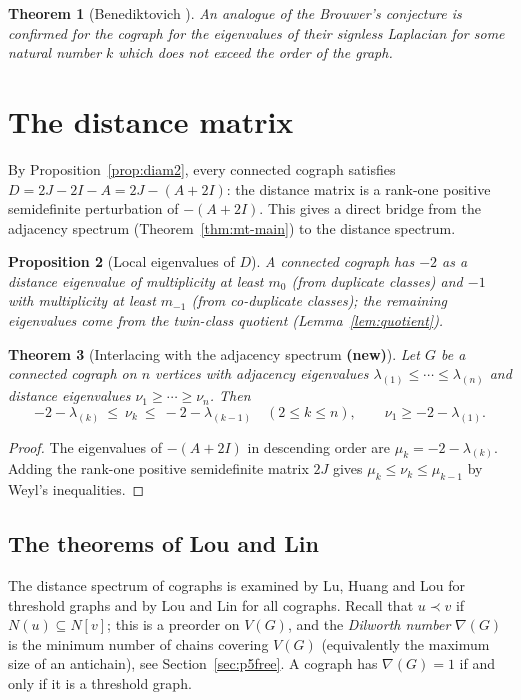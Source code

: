 \documentclass[11pt]{article}
\theoremstyle{plain}
\newtheorem{theorem}{Theorem}[section]
\newtheorem{proposition}[theorem]{Proposition}
\theoremstyle{definition}
\theoremstyle{remark}
\begin{document}
	\begin{theorem}[Benediktovich \cite{Benedik2020}]
		An analogue of the Brouwer’s conjecture is confirmed for the cograph for the eigenvalues of their signless Laplacian for some natural number $k$ which does not exceed the order of the graph.
		
	\end{theorem}
	
	\section{The distance matrix}
	\label{sec:distance}
	
	By Proposition~\ref{prop:diam2}, every connected cograph satisfies $D=2J-2I-A=2J-(A+2I)$: the distance matrix is a rank-one positive semidefinite perturbation of $-(A+2I)$. This gives a direct bridge from the adjacency spectrum (Theorem~\ref{thm:mt-main}) to the distance spectrum.
	
	\begin{proposition}[Local eigenvalues of $D$]
		\label{prop:Dlocal}
		A connected cograph has $-2$ as a distance eigenvalue of multiplicity at least $m_0$ (from duplicate classes) and $-1$ with multiplicity at least $m_{-1}$ (from co-duplicate classes); the remaining eigenvalues come from the twin-class quotient (Lemma~\ref{lem:quotient}).
	\end{proposition}
	
	\begin{theorem}[Interlacing with the adjacency spectrum \textbf{(new)}]
		\label{thm:Dinterlace}
		Let $G$ be a connected cograph on $n$ vertices with adjacency eigenvalues $\lambda_{(1)}\le\cdots\le\lambda_{(n)}$ and distance eigenvalues $\nu_1\ge\cdots\ge\nu_n$. Then
		\[
		-2-\lambda_{(k)}\ \le\ \nu_k\ \le\ -2-\lambda_{(k-1)}\quad(2\le k\le n),\qquad \nu_1\ge-2-\lambda_{(1)}.
		\]
	\end{theorem}
	\begin{proof}
		The eigenvalues of $-(A+2I)$ in descending order are $\mu_k=-2-\lambda_{(k)}$. Adding the rank-one positive semidefinite matrix $2J$ gives $\mu_k\le\nu_k\le\mu_{k-1}$ by Weyl's inequalities.
	\end{proof}
	
	
	\subsection{The theorems of Lou and Lin}
	
	The distance spectrum of cographs is examined by Lu, Huang and Lou \cite{LuHuangLou2018} for threshold graphs and by Lou and Lin \cite{LouLin2020} for all cographs. Recall that $u\prec v$ if $N(u)\subseteq N[v]$; this is a preorder on $V(G)$, and the \emph{Dilworth number} $\nabla(G)$ is the minimum number of chains covering $V(G)$ (equivalently the maximum size of an antichain), see Section~\ref{sec:p5free}. A cograph has $\nabla(G)=1$ if and only if it is a threshold graph.
	
\end{document}
